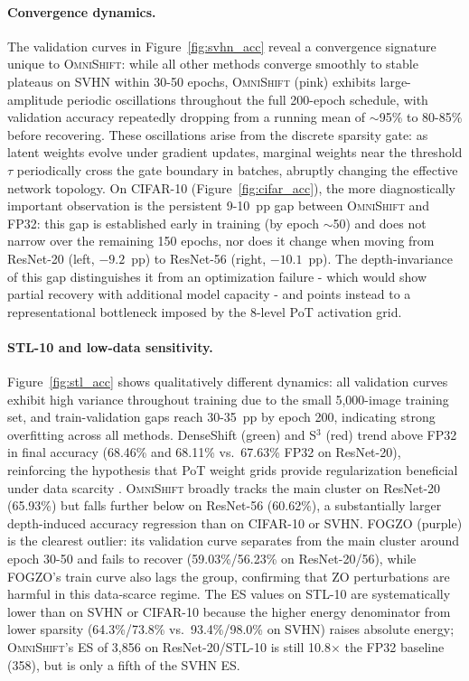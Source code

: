 \documentclass[12pt]{article}
\newcommand{\omnishift}{\textsc{OmniShift}}
\begin{document}
\paragraph{Convergence dynamics.} The validation curves in Figure~\ref{fig:svhn_acc} reveal a convergence signature unique to \omnishift{}: while all other methods converge smoothly to stable plateaus on SVHN within 30-50 epochs, \omnishift{} (pink) exhibits large-amplitude periodic oscillations throughout the full 200-epoch schedule, with validation accuracy repeatedly dropping from a running mean of $\sim$95\% to 80-85\% before recovering. These oscillations arise from the discrete sparsity gate: as latent weights evolve under gradient updates, marginal weights near the threshold $\tau$ periodically cross the gate boundary in batches, abruptly changing the effective network topology. On CIFAR-10 (Figure~\ref{fig:cifar_acc}), the more diagnostically important observation is the persistent 9-10~pp gap between \omnishift{} and FP32: this gap is established early in training (by epoch $\sim$50) and does not narrow over the remaining 150 epochs, nor does it change when moving from ResNet-20 (left, $-9.2$~pp) to ResNet-56 (right, $-10.1$~pp). The depth-invariance of this gap distinguishes it from an optimization failure - which would show partial recovery with additional model capacity - and points instead to a representational bottleneck imposed by the 8-level PoT activation grid.

\paragraph{STL-10 and low-data sensitivity.} Figure~\ref{fig:stl_acc} shows qualitatively different dynamics: all validation curves exhibit high variance throughout training due to the small 5,000-image training set, and train-validation gaps reach 30-35~pp by epoch 200, indicating strong overfitting across all methods. DenseShift (green) and S$^3$ (red) trend above FP32 in final accuracy (68.46\% and 68.11\% vs.\ 67.63\% FP32 on ResNet-20), reinforcing the hypothesis that PoT weight grids provide regularization beneficial under data scarcity \cite{liu2019rethinkpruning}. \omnishift{} broadly tracks the main cluster on ResNet-20 (65.93\%) but falls further below on ResNet-56 (60.62\%), a substantially larger depth-induced accuracy regression than on CIFAR-10 or SVHN. FOGZO (purple) is the clearest outlier: its validation curve separates from the main cluster around epoch 30-50 and fails to recover (59.03\%/56.23\% on ResNet-20/56), while FOGZO's train curve also lags the group, confirming that ZO perturbations are harmful in this data-scarce regime. The ES values on STL-10 are systematically lower than on SVHN or CIFAR-10 because the higher energy denominator from lower sparsity (64.3\%/73.8\% vs.\ 93.4\%/98.0\% on SVHN) raises absolute energy; \omnishift{}'s ES of 3,856 on ResNet-20/STL-10 is still 10.8$\times$ the FP32 baseline (358), but is only a fifth of the SVHN ES.
\end{document}
